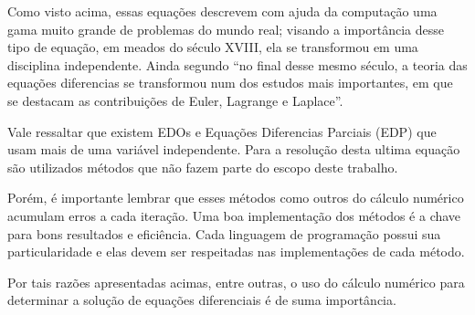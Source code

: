 Como visto acima, essas equações descrevem com ajuda da computação
uma gama muito grande de problemas do mundo real; visando a importância
desse tipo de equação, em meados do século XVIII, ela se transformou em
uma disciplina independente. Ainda segundo  ``no final desse 
mesmo século, a teoria das equações diferencias se transformou num
dos estudos mais importantes, em que se destacam as contribuições de 
Euler, Lagrange e Laplace''.

Vale ressaltar que existem EDOs e
Equações Diferencias Parciais (EDP) que usam mais de uma variável
independente. Para a resolução desta ultima equação são utilizados
métodos que não fazem parte do escopo deste trabalho.
 
Porém, é importante lembrar que esses métodos
como outros do cálculo numérico acumulam erros a cada iteração.
Uma boa implementação dos métodos é a chave para bons resultados
e eficiência. Cada linguagem de programação possui sua particularidade
e elas devem ser respeitadas nas implementações de cada método. 

Por tais razões apresentadas acimas, entre outras, o uso do cálculo
numérico para determinar a solução de equações diferenciais 
é de suma importância.
